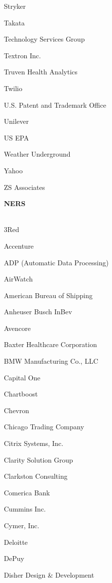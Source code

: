 \documentclass[twoside]{article}
\begin{document}
\begin{center}
\begin{multicols}{5}
\begin{FlushLeft}
\begin{compactitem}
\item Stryker
\item Takata
\item Technology Services Group
\item Textron Inc.
\item Truven Health Analytics
\item Twilio
\item U.S. Patent and Trademark Office
\item Unilever
\item US EPA
\item Weather Underground
\item Yahoo
\item ZS Associates
\end{compactitem}
        \end{FlushLeft}
        \vspace{1em}
        {\fontsize{14}{16}\selectfont \bf NERS}\\
        \vspace{-1em}
        ~\hrulefill~
        \vspace{-.9em}
        \begin{FlushLeft}
        \begin{compactitem}
        \item 3Red
\item Accenture
\item ADP (Automatic Data Processing)
\item AirWatch
\item American Bureau of Shipping
\item Anheuser Busch InBev
\item Avencore
\item Baxter Healthcare Corporation
\item BMW Manufacturing Co., LLC
\item Capital One
\item Chartboost
\item Chevron
\item Chicago Trading Company
\item Citrix Systems, Inc.
\item Clarity Solution Group
\item Clarkston Consulting
\item Comerica Bank
\item Cummins Inc.
\item Cymer, Inc.
\item Deloitte
\item DePuy
\item Disher Design \& Development

\end{compactitem}
\end{FlushLeft}
\end{multicols}
\end{center}
\end{document}
